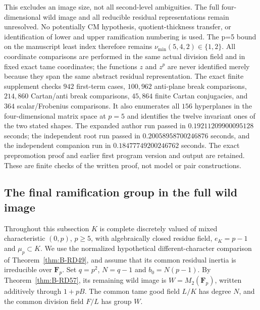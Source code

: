 \begin{remark}
\label{rem:B-RD57-scope}
This excludes an image size, not all second-level ambiguities.
The full four-dimensional wild image and all reducible residual
representations remain unresolved. No potentially CM hypothesis,
quotient-thickness transfer, or identification of lower and upper
ramification numbering is used. The p=5 bound on the manuscript
least index therefore remains $\nu_{\min}(5,4,2)\in\{1,2\}$.
All coordinate comparisons are performed in the same actual division
field and in fixed exact tame coordinates; the functions $z$ and
$z^p$ are never identified merely because they span the same abstract
residual representation.
The exact finite supplement
checks $942$ first-term cases, $100{,}962$ anti-plane break comparisons,
$214{,}860$ Cartan/anti break comparisons, $45{,}864$ finite Cartan
conjugacies, and $364$ scalar/Frobenius comparisons. It also enumerates
all $156$ hyperplanes in the four-dimensional matrix space at $p=5$
and identifies the twelve invariant ones of the two stated shapes.
The expanded author run passed in $0.19211209900095128$ seconds;
the independent root run passed in $0.20058958700246876$ seconds, and
the independent companion run in $0.18477749200246762$ seconds.
The exact prepromotion proof and earlier first program version and output
are retained. These are finite
checks of the written proof, not model or pair constructions.
\end{remark}


\subsection{The final ramification group in the full wild image}

Throughout this subsection $K$ is complete discretely valued of mixed
characteristic $(0,p)$, $p\ge5$, with algebraically closed residue field,
$e_K=p-1$ and $\mu_p\subset K$. We use the normalized hypothetical
different-character comparison of Theorem~\ref{thm:B-RD49}, and assume
that its common residual inertia is irreducible over $\mathbf F_p$.
Set $q=p^2$, $N=q-1$ and $b_0=N(p-1)$. By
Theorem~\ref{thm:B-RD57}, its remaining wild image is
$W=M_2(\mathbf F_p)$, written additively through $1+pB$.
The common tame good field $L/K$ has degree $N$, and the common
division field $F/L$ has group $W$.

